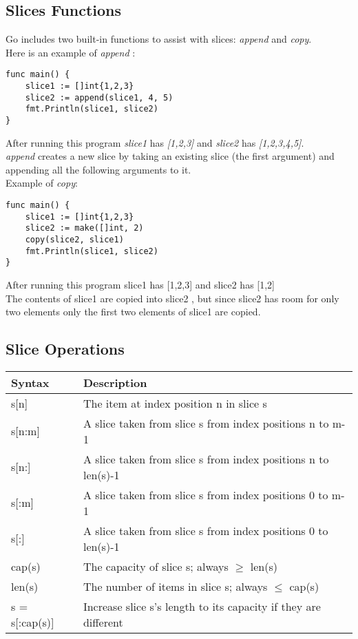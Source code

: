 \documentclass[10pt,letterpaper]{report}
\begin{document}
\subsection{Slices Functions}
Go includes two built-in functions to assist with slices: \textit{append} and \textit{copy}.\\
Here is an example of \textit{append} :
\begin{lstlisting}
func main() {
	slice1 := []int{1,2,3}
	slice2 := append(slice1, 4, 5)
	fmt.Println(slice1, slice2)
}
\end{lstlisting}
After running this program \textit{slice1} has \textit{[1,2,3]} and \textit{slice2} has \textit{[1,2,3,4,5]}.\\
\textit{append} creates a new slice by taking an existing slice (the first argument) and appending all the following arguments to it.\\
Example of \textit{copy}:
\begin{lstlisting}
func main() {
	slice1 := []int{1,2,3}
	slice2 := make([]int, 2)
	copy(slice2, slice1)
	fmt.Println(slice1, slice2)
}
\end{lstlisting}
After running this program slice1 has [1,2,3] and slice2 has [1,2]\\
The contents of slice1 are copied into slice2 , but since slice2 has room for only two elements only the first two elements of slice1 are copied.
\subsection{Slice Operations}
\label{subsec:sliceops}
\begin{tabular}{|l|p{10cm}|}
\hline
Syntax & Description\\ \hline
s[n] & The item at index position n in slice s\\ \hline
s[n:m] & A slice taken from slice s from index positions n to m-1\\ \hline
s[n:] & A slice taken from slice s from index positions n to len(s)-1\\ \hline
s[:m] & A slice taken from slice s from index positions 0 to m-1\\ \hline
s[:] & A slice taken from slice s from index positions 0 to len(s)-1\\ \hline
cap(s) & The capacity of slice s; always $\ge$ len(s)\\ \hline
len(s) & The number of items in slice s; always $\le$ cap(s)\\ \hline
s = s[:cap(s)] & Increase slice s's length to its capacity if they are different\\ \hline
\end{tabular}
\end{document}
